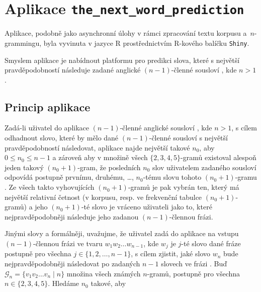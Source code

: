 
\section{Aplikace \texttt{the\_next\_word\_prediction}}%

Aplikace, podobně jako asynchronní úlohy v rámci zpracování textu%
korpusu a~$n$-grammingu, byla vyvinuta v jazyce
\textsf{R} prostřednictvím
\textsf{R}-kového balíčku \texttt{Shiny}.

Smyslem aplikace je nabídnout platformu pro predikci slova, které s největší
pravděpodobností následuje zadané anglické $(n - 1)$-členné sousloví%
, kde
$n > 1$.


\subsection{Princip aplikace}
\label{subsec:princip_aplikace}

Zadá-li uživatel do aplikace $(n - 1)$-členné anglické sousloví%
, kde $n > 1$,
s cílem odhadnout slovo, které by mělo dané $(n - 1)$-členné sousloví%
s největší pravděpodobností následovat, aplikace najde největší
takové $n_{0}$, aby $0 \leq n_{0} \leq n - 1$ a zároveň aby v množině
všech $\{2, 3, 4, 5\}$-gramů existoval alespoň jeden
takový $(n_{0} + 1)$-gram,
že posledních $n_{0}$ slov uživatelem zadaného sousloví odpovídá postupně
prvnímu, druhému, \ldots, $n_{0}$-tému slovu tohoto $(n_{0} + 1)$-gramu%
.
Ze všech takto vyhovujících $(n_{0} + 1)$-gramů je pak vybrán ten, který má
největší relativní četnost (v korpusu, resp. ve frekvenční tabulce%
$(n_{0} + 1)$-gramů) a jeho $(n_{0} + 1)$-té slovo je vráceno uživateli
jako to, které nejpravděpodobněji následuje jeho zadanou
$(n - 1)$-člennou frázi.

Jinými slovy a formálněji, uvažujme, že uživatel zadá do aplikace na
vstupu \mbox{$(n -1)$-člennou} frázi%
 ve tvaru $w_{1}w_{2} \ldots w_{n - 1}$,
kde $w_{j}$ je $j$-té slovo dané fráze postupně pro všechna
$j \in \{ 1, 2, \ldots, n - 1 \}$, s cílem zjistit, jaké slovo $w_{n}$%
bude nejpravděpodobněji následovat po zadaných $n - 1$ slovech ve frázi%
.
Buď $\mathcal{G}_{n} = \{v_{1}v_{2} \ldots v_{n} \mid n\}$ množina všech
známých $n$-gramů, postupně pro všechna $n \in \{2, 3, 4, 5\}$.
Hledáme $n_{0}$ takové, aby

